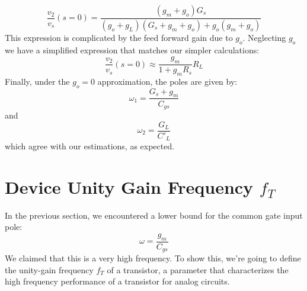     \begin{equation}
        \frac{v_2}{v_s}(s = 0) = \frac{(g_m + g_o) G_s}{(g_o + g_L)(G_s + g_m + g_o) + g_o (g_m + g_o)} 
    \end{equation}
This expression is complicated by the feed forward gain due to $g_o$.  Neglecting $g_o$ we have a simplified expression that matches our simpler calculations:
    \begin{equation}
        \frac{v_2}{v_s}(s = 0) \approx \frac{g_m}{1 + g_m R_s} R_L 
    \end{equation}
Finally, under the $g_o = 0$ approximation, the poles are given by:
    \begin{equation}
        \omega_1 = \frac{G_s + g_m}{C_{gs}}
    \end{equation}
and
    \begin{equation}
        \omega_2 = \frac{G_L}{C'_{L}}
    \end{equation}
which agree with our estimations, as expected.
\section{Device Unity Gain Frequency \texorpdfstring{$f_T$}{}}
In the previous section, we encountered a lower bound for the common gate input pole:
    \begin{equation}
        \omega = \frac{g_m}{C_{gs}}
    \end{equation}
We claimed that this is a very high frequency.  To show this, we're going to define the unity-gain frequency $f_T$ of a transistor, a parameter that characterizes the high frequency performance of a transistor for analog circuits.
